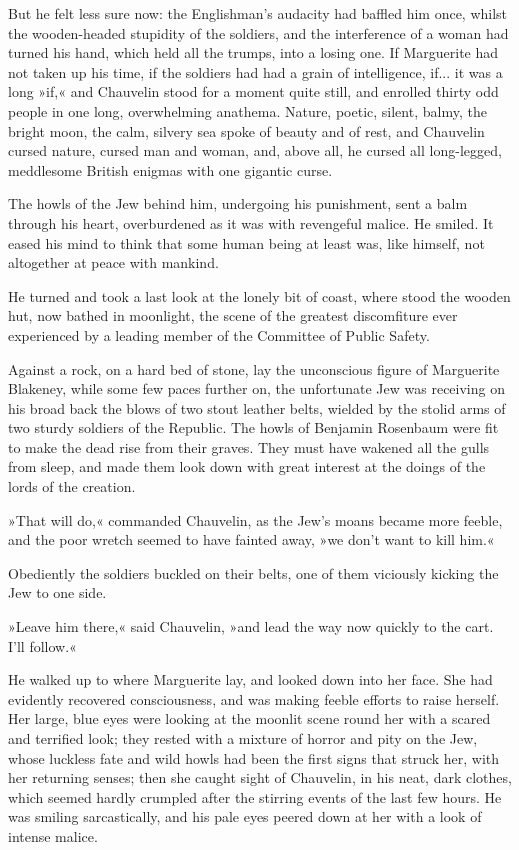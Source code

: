 But he felt less sure now: the Englishman's audacity had baffled him once, whilst the wooden-headed stupidity of the soldiers, and the interference of a woman had turned his hand, which held all the trumps, into a losing one. If Marguerite had not taken up his time, if the soldiers had had a grain of intelligence, if... it was a long »if,« and Chauvelin stood for a moment quite still, and enrolled thirty odd people in one long, overwhelming anathema. Nature, poetic, silent, balmy, the bright moon, the calm, silvery sea spoke of beauty and of rest, and Chauvelin cursed nature, cursed man and woman, and, above all, he cursed all long-legged, meddlesome British enigmas with one gigantic curse.

The howls of the Jew behind him, undergoing his punishment, sent a balm through his heart, overburdened as it was with revengeful malice. He smiled. It eased his mind to think that some human being at least was, like himself, not altogether at peace with mankind.

He turned and took a last look at the lonely bit of coast, where stood the wooden hut, now bathed in moonlight, the scene of the greatest discomfiture ever experienced by a leading member of the Committee of Public Safety.

Against a rock, on a hard bed of stone, lay the unconscious figure of Marguerite Blakeney, while some few paces further on, the unfortunate Jew was receiving on his broad back the blows of two stout leather belts, wielded by the stolid arms of two sturdy soldiers of the Republic. The howls of Benjamin Rosenbaum were fit to make the dead rise from their graves. They must have wakened all the gulls from sleep, and made them look down with great interest at the doings of the lords of the creation.

»That will do,« commanded Chauvelin, as the Jew's moans became more feeble, and the poor wretch seemed to have fainted away, »we don't want to kill him.«

Obediently the soldiers buckled on their belts, one of them viciously kicking the Jew to one side.

»Leave him there,« said Chauvelin, »and lead the way now quickly to the cart. I'll follow.«

He walked up to where Marguerite lay, and looked down into her face. She had evidently recovered consciousness, and was making feeble efforts to raise herself. Her large, blue eyes were looking at the moonlit scene round her with a scared and terrified look; they rested with a mixture of horror and pity on the Jew, whose luckless fate and wild howls had been the first signs that struck her, with her returning senses; then she caught sight of Chauvelin, in his neat, dark clothes, which seemed hardly crumpled after the stirring events of the last few hours. He was smiling sarcastically, and his pale eyes peered down at her with a look of intense malice.

